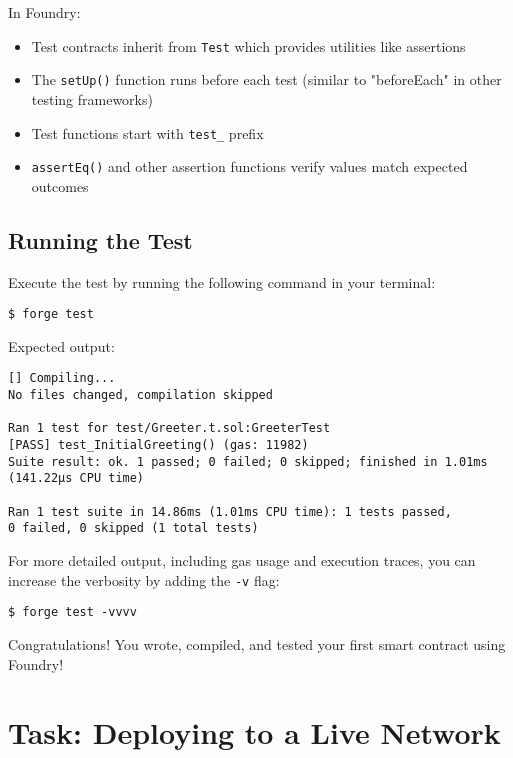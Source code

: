 \documentclass[12pt]{article}
\begin{document}
\noindent
In Foundry:
\begin{itemize}
    \item Test contracts inherit from \texttt{Test} which provides utilities like assertions
    \item The \texttt{setUp()} function runs before each test (similar to "beforeEach" in other testing frameworks)
    \item Test functions start with \texttt{test\_} prefix
    \item \texttt{assertEq()} and other assertion functions verify values match expected outcomes
\end{itemize}

\subsection{Running the Test}

Execute the test by running the following command in your terminal:

\begin{verbatim}
$ forge test
\end{verbatim}

Expected output:
\begin{verbatim}
[] Compiling...
No files changed, compilation skipped

Ran 1 test for test/Greeter.t.sol:GreeterTest
[PASS] test_InitialGreeting() (gas: 11982)
Suite result: ok. 1 passed; 0 failed; 0 skipped; finished in 1.01ms 
(141.22µs CPU time)

Ran 1 test suite in 14.86ms (1.01ms CPU time): 1 tests passed, 
0 failed, 0 skipped (1 total tests)
\end{verbatim}

For more detailed output, including gas usage and execution traces, you can increase the verbosity by adding the \texttt{-v} flag:

\begin{verbatim}
$ forge test -vvvv
\end{verbatim}

Congratulations! You wrote, compiled, and tested your first smart contract using Foundry!

\section{Task: Deploying to a Live Network}
\end{document}

